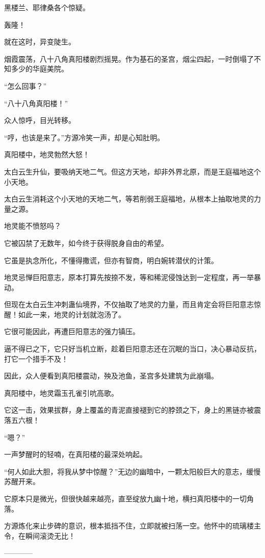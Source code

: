 \begin{this_body}
黑楼兰、耶律桑各个惊疑。

轰隆！

就在这时，异变陡生。

烟霞震荡，八十八角真阳楼剧烈摇晃。作为基石的圣宫，烟尘四起，一时倒塌了不知多少的华庭美院。

“怎么回事？”

“八十八角真阳楼！”

众人惊呼，目光转移。

“哼，也该是来了。”方源冷笑一声，却是心知肚明。

真阳楼中，地灵勃然大怒！

太白云生升仙，要吸纳天地二气。但这方天地，却非外界北原，而是王庭福地这个小天地。

太白云生消耗这个小天地的天地二气，等若削弱王庭福地，从根本上抽取地灵的力量之源。

地灵能不愤怒吗？

它被囚禁了无数年，如今终于获得脱身自由的希望。

它虽是执念所化，不懂得撒谎，但亦有智商，明白婉转潜伏的计策。

地灵忌惮巨阳意志，原本打算先按捺不发，等和稀泥侵蚀达到一定程度，再一举暴动。

但现在太白云生冲刺蛊仙境界，不仅抽取了地灵的力量，而且肯定会将巨阳意志惊醒！如此一来，地灵的计划就泡汤了。

它很可能因此，再遭巨阳意志的强力镇压。

逼不得已之下，它只好当机立断，趁着巨阳意志还在沉眠的当口，决心暴动反抗，打它一个措手不及！

因此，众人便看到真阳楼震动，殃及池鱼，圣宫多处建筑为此崩塌。

真阳楼中，地灵霜玉孔雀引吭高歌。

它这一击，效果拔群，身上覆盖的青泥直接褪到它的脖颈之下，身上的黑链亦被震落五六根！

“嗯？”

一声梦醒时的轻喃，在真阳楼的最深处响起。

“何人如此大胆，将我从梦中惊醒？”无边的幽暗中，一颗太阳般巨大的意志，缓慢苏醒开来。

它原本只是微光，但很快越来越亮，直至绽放九幽十地，横扫真阳楼中的一切角落。

方源炼化来止步碑的意识，根本抵挡不住，立即就被扫荡一空。他怀中的琉璃楼主令，在瞬间滚烫无比！

------------

\end{this_body}

